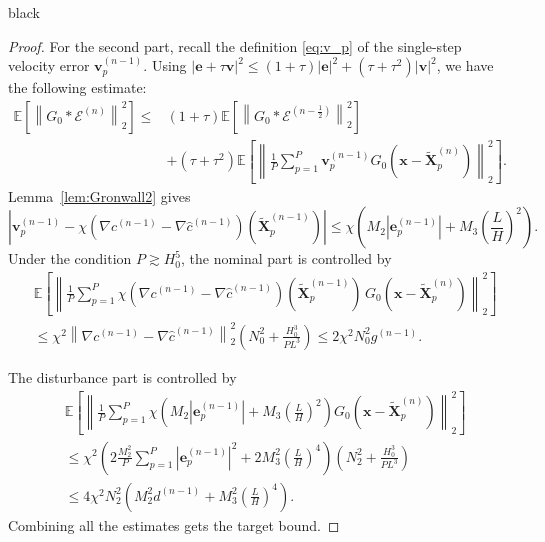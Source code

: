 \documentclass[review,onefignum,onetabnum]{siamart250211}
\begin{document}
\begin{color}{black}
\begin{proof}
For the second part, recall the definition \eqref{eq:v_p} of the single-step velocity error $\mathbf{v}_p^{(n-1)}$. Using \(
|\mathbf{e}+\tau\mathbf{v}|^2
\leq
(1+\tau)|\mathbf{e}|^2
+
(\tau+\tau^2)|\mathbf{v}|^2
\), we have the following estimate:
\begin{equation}
\begin{aligned}
\mathbb{E}\left[\left\|G_0 \ast \mathcal{E}^{(n)}\right\|_2^2\right] \leq& (1+\tau)\mathbb{E}\left[\left\|G_0 \ast \mathcal{E}^{(n-\frac{1}{2})}\right\|_2^2\right]\\
&+ (\tau+\tau^2)\mathbb{E}\left[\left\|\frac{1}{P}\sum_{p=1}^P\mathbf{v}_p^{(n-1)}G_0(\mathbf{x} - \widetilde{\mathbf{X}}_p^{(n)})\right\|_2^2\right].
\end{aligned}
\end{equation}
Lemma~\ref{lem:Gronwall2} gives
\begin{equation}
\left|\mathbf{v}_p^{(n-1)}-\chi \left(\nabla c^{(n-1)}-\nabla \hat{c}^{(n-1)}\right)(\widetilde{\mathbf{X}}_p^{(n-1)})\right| \leq \chi \left(M_2|\mathbf{e}_p^{(n-1)}|+M_3\left(\frac{L}{H}\right)^2\right).
\end{equation}
Under the condition \(P\gtrsim H_0^5\), the nominal part is controlled by
\begin{equation}
\begin{aligned}
&\mathbb{E}\left[\left\|\frac{1}{P}\sum_{p=1}^P\chi \left(\nabla c^{(n-1)}-\nabla \hat{c}^{(n-1)}\right)(\widetilde{\mathbf{X}}_p^{(n-1)})\,G_0(\mathbf{x} - \widetilde{\mathbf{X}}_p^{(n)})\right\|_2^2\right]
\\&\leq\chi^2\left\|\nabla c^{(n-1)}-\nabla \hat{c}^{(n-1)}\right\|_2^2 \left(N_0^2+\frac{H_0^3}{PL^3}\right) \leq 2\chi^2 N_0^2 g^{(n-1)}.
\end{aligned}
\end{equation}

The disturbance part is controlled by
\begin{equation}
\begin{aligned}
&\mathbb{E}\left[\left\|\frac{1}{P}\sum_{p=1}^P\chi \left(M_2|\mathbf{e}_p^{(n-1)}|+M_3\left(\frac{L}{H}\right)^2\right)G_0(\mathbf{x} - \widetilde{\mathbf{X}}_p^{(n)})\right\|_2^2\right]
\\&\leq\chi^2\left(2\frac{M_2^2}{P}\sum_{p=1}^P|\mathbf{e}_p^{(n-1)}|^2+2M_3^2\left(\frac{L}{H}\right)^4\right) \left(N_2^2+\frac{H_0^3}{PL^3}\right)
\\&\leq 4 \chi^2 N_2^2 \left(M_2^2 d^{(n-1)}+M_3^2\left(\frac{L}{H}\right)^4\right).
\end{aligned}
\end{equation}
Combining all the estimates gets the target bound.
\end{proof}
\end{color}
\end{document}
